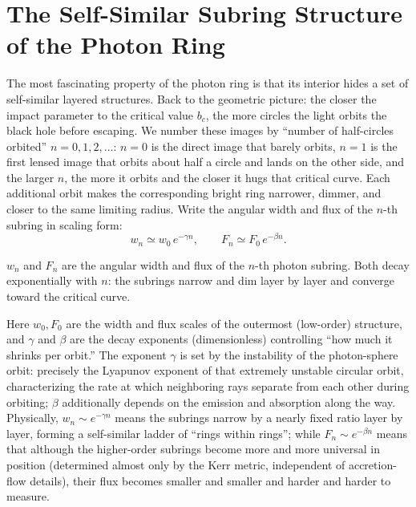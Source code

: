 \section{The Self-Similar Subring Structure of the Photon Ring}
\label{sec:e19-subring}

The most fascinating property of the photon ring is that its interior hides a set of self-similar layered structures. Back to the geometric picture: the closer the impact parameter to the critical value \(b_c\), the more circles the light orbits the black hole before escaping. We number these images by ``number of half-circles orbited'' \(n=0,1,2,\dots\): \(n=0\) is the direct image that barely orbits, \(n=1\) is the first lensed image that orbits about half a circle and lands on the other side, and the larger \(n\), the more it orbits and the closer it hugs that critical curve. Each additional orbit makes the corresponding bright ring narrower, dimmer, and closer to the same limiting radius. Write the angular width and flux of the \(n\)-th subring in scaling form:
\begin{equation}
  w_n\simeq w_0\,e^{-\gamma n},\qquad
  F_n\simeq F_0\,e^{-\beta n}.
  \label{eq:e19-subring}
\end{equation}
\begin{formulaexplain}
\(w_n\) and \(F_n\) are the angular width and flux of the \(n\)-th photon subring. Both decay exponentially with \(n\): the subrings narrow and dim layer by layer and converge toward the critical curve.
\end{formulaexplain}
Here \(w_0,F_0\) are the width and flux scales of the outermost (low-order) structure, and \(\gamma\) and \(\beta\) are the decay exponents (dimensionless) controlling ``how much it shrinks per orbit.'' The exponent \(\gamma\) is set by the instability of the photon-sphere orbit: precisely the Lyapunov exponent of that extremely unstable circular orbit, characterizing the rate at which neighboring rays separate from each other during orbiting; \(\beta\) additionally depends on the emission and absorption along the way. Physically, \(w_n\sim e^{-\gamma n}\) means the subrings narrow by a nearly fixed ratio layer by layer, forming a self-similar ladder of ``rings within rings''; while \(F_n\sim e^{-\beta n}\) means that although the higher-order subrings become more and more universal in position (determined almost only by the Kerr metric, independent of accretion-flow details), their flux becomes smaller and smaller and harder and harder to measure.

